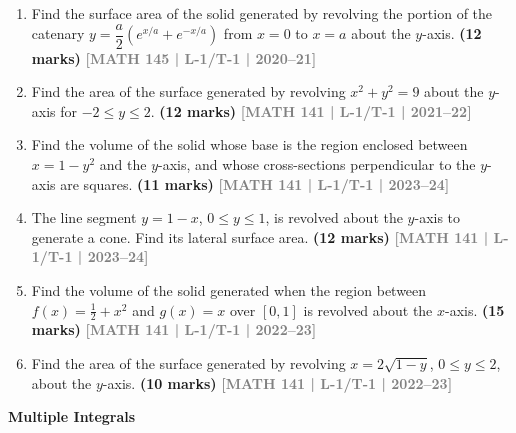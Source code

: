 \documentclass[12pt,a4paper]{article}
\newcommand{\yr}[1]{\hfill\textcolor{gray}{\small\textbf{[#1]}}}
\newcommand{\mk}[1]{\textcolor{orange!70!black}{\small\textbf{(#1 marks)}}}
\newcommand{\subtopic}[2]{%
  \vspace{10pt}
  \noindent\begin{tcolorbox}[colback=#1!8,colframe=#1,boxrule=0.6pt,arc=4pt,
    left=6pt,right=6pt,top=4pt,bottom=4pt]
    \small\bfseries\textcolor{#1}{#2}
  \end{tcolorbox}
  \vspace{2pt}
}
\begin{document}
\begin{enumerate}
\item Find the surface area of the solid generated by revolving the portion of the catenary $y=\dfrac{a}{2}(e^{x/a}+e^{-x/a})$ from $x=0$ to $x=a$ about the $y$-axis.
\mk{12} \yr{MATH 145 | L-1/T-1 | 2020--21}

\item Find the area of the surface generated by revolving $x^{2}+y^{2}=9$ about the $y$-axis for $-2\le y\le 2$.
\mk{12} \yr{MATH 141 | L-1/T-1 | 2021--22}

\item Find the volume of the solid whose base is the region enclosed between $x=1-y^{2}$ and the $y$-axis, and whose cross-sections perpendicular to the $y$-axis are squares.
\mk{11} \yr{MATH 141 | L-1/T-1 | 2023--24}

\item The line segment $y=1-x$, $0\le y\le 1$, is revolved about the $y$-axis to generate a cone. Find its lateral surface area.
\mk{12} \yr{MATH 141 | L-1/T-1 | 2023--24}

\item Find the volume of the solid generated when the region between $f(x)=\tfrac{1}{2}+x^{2}$ and $g(x)=x$ over $[0,1]$ is revolved about the $x$-axis.
\mk{15} \yr{MATH 141 | L-1/T-1 | 2022--23}

\item Find the area of the surface generated by revolving $x=2\sqrt{1-y}$, $0\le y\le 2$, about the $y$-axis.
\mk{10} \yr{MATH 141 | L-1/T-1 | 2022--23}

\end{enumerate}

\subtopic{cB}{Multiple Integrals}
\label{sub:s2-multiple}
\end{document}
